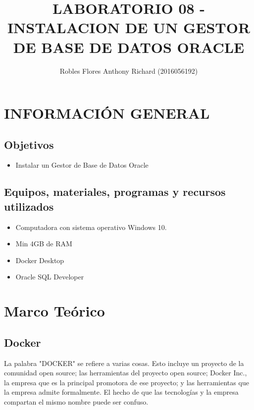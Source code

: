 \documentclass[preprint,12pt]{elsarticle}
\begin{document}
	
	\begin{frontmatter} 

		\title{\huge LABORATORIO 08 - INSTALACION DE UN GESTOR DE BASE DE DATOS ORACLE}
		
		\author{Robles Flores Anthony Richard         	(2016056192)} 
		\address{Escuela Profesional de Ingeniería de Sistemas}
		\address{Universidad Privada de Tacna}
		\address{Tacna, Perú}
		

	\end{frontmatter}



\section{INFORMACIÓN GENERAL} 

\subsection {\textbf{Objetivos}}
\begin{itemize}
	\item Instalar un Gestor de Base de Datos Oracle
\end{itemize}

\subsection {\textbf{Equipos, materiales, programas y recursos utilizados}}
\begin{itemize}
	\item Computadora con sistema operativo Windows 10.
	\item Min 4GB de RAM
	\item Docker Desktop
	\item Oracle SQL Developer
\end{itemize}


\section{Marco Teórico}



\subsection {\textbf{Docker}}
La palabra "DOCKER" se refiere a varias cosas. Esto incluye un proyecto de la comunidad open source; las herramientas del proyecto open source; Docker Inc., la empresa que es la principal promotora de ese proyecto; y las herramientas que la empresa admite formalmente. El hecho de que las tecnologías y la empresa compartan el mismo nombre puede ser confuso.
\end{document}

